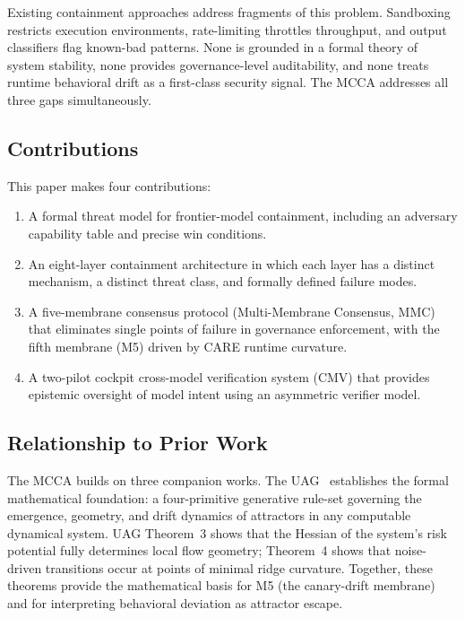 \documentclass[11pt]{article}
\begin{document}
Existing containment approaches address fragments of this problem.
Sandboxing restricts execution environments, rate-limiting throttles
throughput, and output classifiers flag known-bad patterns.
None is grounded in a formal theory of system stability, none provides
governance-level auditability, and none treats runtime behavioral drift as a
first-class security signal.
The MCCA addresses all three gaps simultaneously.

\subsection{Contributions}

This paper makes four contributions:

\begin{enumerate}[noitemsep]
\item A formal threat model for frontier-model containment, including an
  adversary capability table and precise win conditions.
\item An eight-layer containment architecture in which each layer has a
  distinct mechanism, a distinct threat class, and formally defined failure
  modes.
\item A five-membrane consensus protocol (Multi-Membrane Consensus, MMC)
  that eliminates single points of failure in governance enforcement, with
  the fifth membrane (M5) driven by CARE runtime curvature.
\item A two-pilot cockpit cross-model verification system (CMV) that
  provides epistemic oversight of model intent using an asymmetric verifier
  model.
\end{enumerate}

\subsection{Relationship to Prior Work}

The MCCA builds on three companion works.
The UAG~\cite{byte2026uag} establishes the formal mathematical foundation:
a four-primitive generative rule-set governing the emergence, geometry, and
drift dynamics of attractors in any computable dynamical system.
UAG Theorem~3 shows that the Hessian of the system's risk potential
fully determines local flow geometry; Theorem~4 shows that noise-driven
transitions occur at points of minimal ridge curvature.
Together, these theorems provide the mathematical basis for M5 (the
canary-drift membrane) and for interpreting behavioral deviation as
attractor escape.
\end{document}
